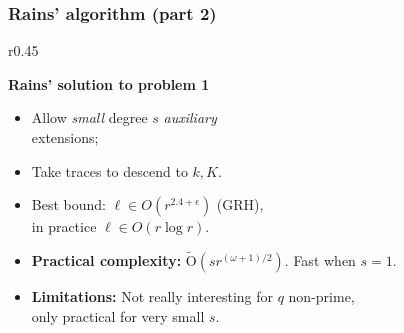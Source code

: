 \documentclass[francais]{beamer}
\def\F {\ensuremath{\mathbb{F}}}
\def\tildO {\ensuremath{\mathrm{\tilde{O}}}}
\newcommand{\paragraph}[1]{\smallskip\textbf{#1}}
\begin{document}
\begin{frame}\frametitle{Rains' algorithm (part 2)}
  \begin{wrapfigure}[1]{r}{0.45\textwidth}
    \vspace{-1em}
      \centering
    \end{wrapfigure}
    \paragraph{Rains' solution to problem 1}
    \begin{itemize}
    \item Allow \emph{small} degree $s$ \emph{auxiliary}\\ extensions;
    \item Take traces to descend to $k, K$.
    \item Best bound: $\ell\in O(r^{2.4+\epsilon})$ (GRH),\\
      in practice $\ell\in O(r\log r)$.
    \end{itemize}

    \bigskip
    \begin{itemize}
    \item \textbf{Practical complexity:}
      $\tildO\left(sr^{(\omega+1)/2}\right)$. Fast when $s=1$.
    \item \textbf{Limitations:}  Not really interesting for $q$ non-prime,\\
      only practical for very small $s$.
    \end{itemize}
\end{frame}
\end{document}
